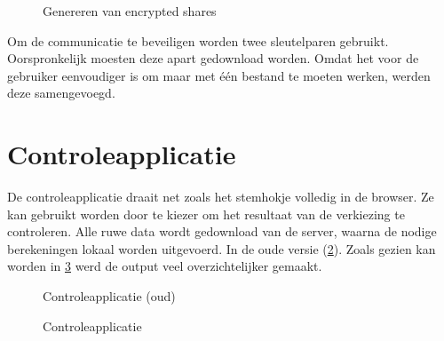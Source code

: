 \begin{figure}
  \caption{Genereren van encrypted shares}
  \label{fig:ui:trustees_home_encrypted_shares}
\end{figure}


\npar Om de communicatie te beveiligen worden twee sleutelparen gebruikt. Oorspronkelijk moesten deze apart gedownload worden. Omdat het voor de gebruiker eenvoudiger is om maar met \'e\'en bestand te moeten werken, werden deze samengevoegd.

\section{Controleapplicatie}
\label{sec:ui:controleapplicatie}

De controleapplicatie draait net zoals het stemhokje volledig in de browser. Ze kan gebruikt worden door te kiezer om het resultaat van de verkiezing te controleren. Alle ruwe data wordt gedownload van de server, waarna de nodige berekeningen lokaal worden uitgevoerd. In de oude versie (\ref{fig:ui:verifier_old}). Zoals gezien kan worden in \ref{fig:ui:verifier} werd de output veel overzichtelijker gemaakt.

\begin{figure}
  \caption{Controleapplicatie (oud)}
  \label{fig:ui:verifier_old}
\end{figure}

\begin{figure}
  \caption{Controleapplicatie}
  \label{fig:ui:verifier}
\end{figure}
